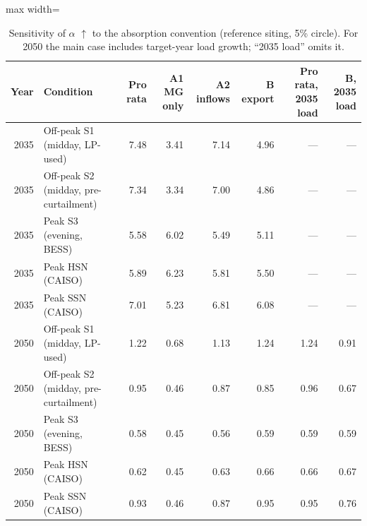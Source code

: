 \begin{table}[!htbp]
\centering
\scriptsize
\caption{Sensitivity of $\alpha$ $\uparrow$ to the absorption convention (reference siting, 5\% circle). For 2050 the main case includes target-year load growth; \enquote{2035 load} omits it.}
\label{tab:absorption}
\begin{adjustbox}{max width=\linewidth}
\begin{tabular}{rlrrrrrr}
\toprule
Year & Condition & Pro rata & A1 MG only & A2 inflows & B export & Pro rata, 2035 load & B, 2035 load \\
\midrule
2035 & Off-peak S1 (midday, LP-used) & 7.48 & 3.41 & 7.14 & 4.96 & — & — \\
2035 & Off-peak S2 (midday, pre-curtailment) & 7.34 & 3.34 & 7.00 & 4.86 & — & — \\
2035 & Peak S3 (evening, BESS) & 5.58 & 6.02 & 5.49 & 5.11 & — & — \\
2035 & Peak HSN (CAISO) & 5.89 & 6.23 & 5.81 & 5.50 & — & — \\
2035 & Peak SSN (CAISO) & 7.01 & 5.23 & 6.81 & 6.08 & — & — \\
2050 & Off-peak S1 (midday, LP-used) & 1.22 & 0.68 & 1.13 & 1.24 & 1.24 & 0.91 \\
2050 & Off-peak S2 (midday, pre-curtailment) & 0.95 & 0.46 & 0.87 & 0.85 & 0.96 & 0.67 \\
2050 & Peak S3 (evening, BESS) & 0.58 & 0.45 & 0.56 & 0.59 & 0.59 & 0.59 \\
2050 & Peak HSN (CAISO) & 0.62 & 0.45 & 0.63 & 0.66 & 0.66 & 0.67 \\
2050 & Peak SSN (CAISO) & 0.93 & 0.46 & 0.87 & 0.95 & 0.95 & 0.76 \\
\bottomrule
\end{tabular}
\end{adjustbox}
\end{table}
